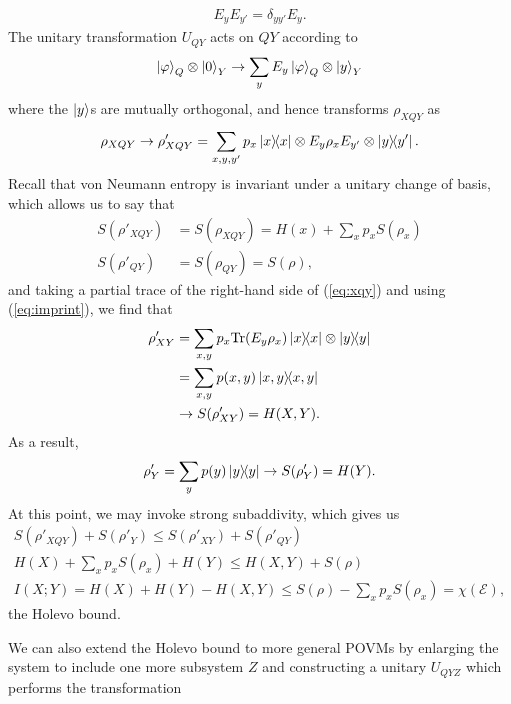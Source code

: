 \documentclass[a4paper, 12pt]{article}
\numberwithin{equation}{section}
\numberwithin{figure}{section}
\theoremstyle{definition}
\begin{document}
    \begin{align}
        E_y E_{y'} = \delta_{yy'} E_y. \label{eq:imprint}
    \end{align}
    The unitary transformation $U_{QY}$ acts on $QY$ according to
    \begin{align}
        \ket{\varphi}_Q \otimes \ket{0}_Y \to \sum_y E_y \ket{\varphi}_Q \otimes \ket{y}_Y
    \end{align}
    where the $\ket{y}$s are mutually orthogonal, and hence transforms $\rho_{XQY}$ as
    \begin{align}
        \rho_{XQY} \to \rho'_{XQY} = \sum_{x, y, y'} p_x \dyad{x}{x} \otimes E_y \rho_x E_{y'} \otimes \dyad{y}{y'}. \label{eq:xqy}
    \end{align}
    Recall that von Neumann entropy is invariant under a unitary change of basis, which allows us to say that
    \begin{align}
        S(\rho'_{XQY}) &= S(\rho_{XQY}) = H(x) + \sum_x p_x S(\rho_x) \\
        S(\rho'_{QY}) &= S(\rho_{QY}) = S(\rho),
    \end{align}
    and taking a partial trace of the right-hand side of (\ref{eq:xqy}) and using (\ref{eq:imprint}), we find that
    \begin{align}
        \rho'_{XY} &= \sum_{x, y} p_x \text{Tr}(E_y \rho_x) \dyad{x}{x} \otimes \dyad{y}{y} \\
        &= \sum_{x, y} p(x, y) \dyad{x, y}{x, y} \\
        &\to S(\rho'_{XY}) = H(X, Y).
    \end{align}
    As a result,
    \begin{align}
        \rho'_Y = \sum_y p(y) \dyad{y}{y} \to S(\rho'_Y) = H(Y).
    \end{align}
    At this point, we may invoke strong subaddivity, which gives us
    \begin{gather}
        S(\rho'_{XQY}) + S(\rho'_Y) \leq S(\rho'_{XY}) + S(\rho'_{QY}) \\
        H(X) + \sum_x p_x S(\rho_x) + H(Y) \leq H(X, Y) + S(\rho) \\
        I(X; Y) = H(X) + H(Y) - H(X, Y) \leq S(\rho) - \sum_x p_x S(\rho_x) = \chi(\mathcal{E}),
    \end{gather}
    the Holevo bound. \par
    We can also extend the Holevo bound to more general POVMs by enlarging the system to include one more subsystem $Z$ and constructing a unitary $U_{QYZ}$ which performs the transformation
\end{document}
